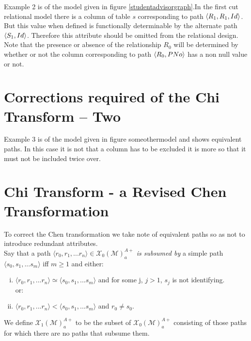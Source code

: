 \documentclass[10pt,a4paper]{article}
\newcommand{\genericmodel}{\mathcal{M}}
\newcommand{\chen}{\mathcal{X}_0}
\newcommand{\chenFKattrs}[1]{\chen(\genericmodel)^{A+}_{#1}}
\newcommand{\chiOne}[1]{{\mathcal{X}_1}(\genericmodel)^{A+}_{#1}}
\begin{document}
Example 2 is of the model given in figure \ref{studentadvisorgraph}.In the first cut  relational model 
there is a column of table $s$ corresponding to path $\langle R_1,R_1,Id\rangle$. But this value when defined is functionally determinable by the alternate path $\langle S_1,Id\rangle$. 
Therefore this attribute should be
omitted from the relational design. Note that the presence or absence of the relationship $R_0$ will be determined by whether or not the column corresponding to path $\langle R_0,PNo\rangle$ has a non null value or not.
\section{Corrections required of the Chi Transform -- Two}
Example 3 is of the model given in figure someothermodel and shows equivalent paths.
In this case it is not that a column has to be excluded it is more so that it must not be included twice over.

\section{Chi Transform - a Revised Chen Transformation}

\newcommand{\pathclasses}[1]{\chenFKattrs{#1}\hspace{-1pt}/\hspace{-2pt}\simeq}

\noindent To correct the Chen transformation we take note of equivalent paths so as not to introduce redundant attributes. \\

\noindent
Say that a path $\langle r_0,r_1,...r_n \rangle \in \chenFKattrs{a}$ \textit{is subsumed by} a simple path 
$\langle s_0,s_1,...s_m \rangle$ iff $m \geq 1$ and either:
\begin{enumerate} [(i)]

\item $\langle r_0,r_1,...r_n \rangle \simeq  \langle s_0,s_1,...s_m \rangle$ and for some j, $j > 1$,
$s_j$ is not identifying. \\

 \hspace{1cm} or:
\item $\langle r_0,r_1,...r_n \rangle <  \langle s_0,s_1,...s_m \rangle$ and $r_0 \neq s_0$.
\end{enumerate}



\noindent
We define $\chiOne{a}$ to be the subset of $\chenFKattrs{a}$ consisting of those paths for which there are no paths that subsume them. \\
 
\end{document}
